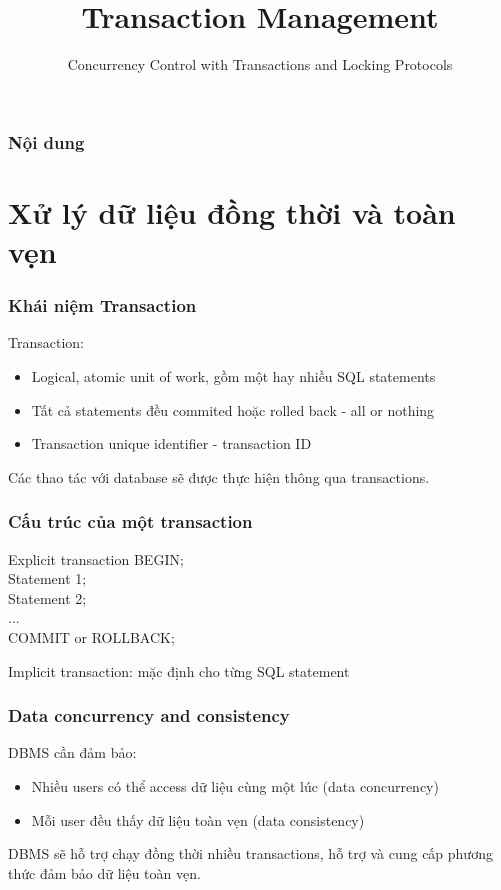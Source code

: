 \documentclass[xcolor={table, dvipsnames}]{beamer}
\title{Transaction Management}
\subtitle{Concurrency Control with Transactions and Locking Protocols}
\begin{document}
\frame{\titlepage}

\begin{frame}
\frametitle{Nội dung}
\tableofcontents
\end{frame}

\section{Xử lý dữ liệu đồng thời và toàn vẹn}

\begin{frame}
\frametitle{Khái niệm Transaction}
Transaction:
\begin{itemize}
\item Logical, atomic unit of work, gồm một hay nhiều SQL statements
\item Tất cả statements đều commited hoặc rolled back - all or nothing
\item Transaction unique identifier - transaction ID
\end{itemize}
Các thao tác với database sẽ được thực hiện thông qua transactions.
\end{frame}

\begin{frame}
\frametitle{Cấu trúc của một transaction}
\begin{block}{Explicit transaction}
BEGIN;\\
Statement 1;\\
Statement 2;\\
...\\
COMMIT or ROLLBACK;\\
\end{block}
Implicit transaction: mặc định cho từng SQL statement
\end{frame}

\begin{frame}
\frametitle{Data concurrency and consistency}
DBMS cần đảm bảo:
\begin{itemize}
\item Nhiều users có thể access dữ liệu cùng một lúc (data concurrency)
\item Mỗi user đều thấy dữ liệu toàn vẹn (data consistency)
\end{itemize}
DBMS sẽ hỗ trợ chạy đồng thời nhiều transactions, hỗ trợ và cung cấp phương thức đảm bảo dữ liệu toàn vẹn.
\end{frame}
\end{document}
